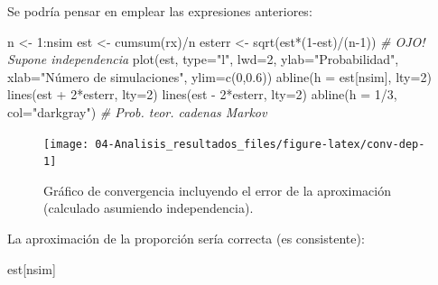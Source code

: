 \documentclass[
]{book}
\newenvironment{Shaded}{\begin{snugshade}}{\end{snugshade}}
\newcommand{\AttributeTok}[1]{\textcolor[rgb]{0.77,0.63,0.00}{#1}}
\newcommand{\CommentTok}[1]{\textcolor[rgb]{0.56,0.35,0.01}{\textit{#1}}}
\newcommand{\DecValTok}[1]{\textcolor[rgb]{0.00,0.00,0.81}{#1}}
\newcommand{\FloatTok}[1]{\textcolor[rgb]{0.00,0.00,0.81}{#1}}
\newcommand{\FunctionTok}[1]{\textcolor[rgb]{0.00,0.00,0.00}{#1}}
\newcommand{\NormalTok}[1]{#1}
\newcommand{\OtherTok}[1]{\textcolor[rgb]{0.56,0.35,0.01}{#1}}
\newcommand{\SpecialCharTok}[1]{\textcolor[rgb]{0.00,0.00,0.00}{#1}}
\newcommand{\StringTok}[1]{\textcolor[rgb]{0.31,0.60,0.02}{#1}}
\theoremstyle{break}
\theoremstyle{definition}
\theoremstyle{definition}
\theoremstyle{definition}
\theoremstyle{definition}
\theoremstyle{remark}
\begin{document}
Se podría pensar en emplear las expresiones anteriores:

\begin{Shaded}
\begin{Highlighting}[]
\NormalTok{n }\OtherTok{\textless{}{-}} \DecValTok{1}\SpecialCharTok{:}\NormalTok{nsim}
\NormalTok{est }\OtherTok{\textless{}{-}} \FunctionTok{cumsum}\NormalTok{(rx)}\SpecialCharTok{/}\NormalTok{n}
\NormalTok{esterr }\OtherTok{\textless{}{-}} \FunctionTok{sqrt}\NormalTok{(est}\SpecialCharTok{*}\NormalTok{(}\DecValTok{1}\SpecialCharTok{{-}}\NormalTok{est)}\SpecialCharTok{/}\NormalTok{(n}\DecValTok{{-}1}\NormalTok{)) }\CommentTok{\# OJO! Supone independencia}
\FunctionTok{plot}\NormalTok{(est, }\AttributeTok{type=}\StringTok{"l"}\NormalTok{, }\AttributeTok{lwd=}\DecValTok{2}\NormalTok{, }\AttributeTok{ylab=}\StringTok{"Probabilidad"}\NormalTok{, }
     \AttributeTok{xlab=}\StringTok{"Número de simulaciones"}\NormalTok{, }\AttributeTok{ylim=}\FunctionTok{c}\NormalTok{(}\DecValTok{0}\NormalTok{,}\FloatTok{0.6}\NormalTok{))}
\FunctionTok{abline}\NormalTok{(}\AttributeTok{h =}\NormalTok{ est[nsim], }\AttributeTok{lty=}\DecValTok{2}\NormalTok{)}
\FunctionTok{lines}\NormalTok{(est }\SpecialCharTok{+} \DecValTok{2}\SpecialCharTok{*}\NormalTok{esterr, }\AttributeTok{lty=}\DecValTok{2}\NormalTok{) }
\FunctionTok{lines}\NormalTok{(est }\SpecialCharTok{{-}} \DecValTok{2}\SpecialCharTok{*}\NormalTok{esterr, }\AttributeTok{lty=}\DecValTok{2}\NormalTok{)}
\FunctionTok{abline}\NormalTok{(}\AttributeTok{h =} \DecValTok{1}\SpecialCharTok{/}\DecValTok{3}\NormalTok{, }\AttributeTok{col=}\StringTok{"darkgray"}\NormalTok{)     }\CommentTok{\# Prob. teor. cadenas Markov}
\end{Highlighting}
\end{Shaded}

\begin{figure}[!htb]

{\centering \texttt{[image: 04-Analisis\_resultados\_files/figure-latex/conv-dep-1]} 

}

\caption{Gráfico de convergencia incluyendo el error de la aproximación (calculado asumiendo independencia).}\label{fig:conv-dep}
\end{figure}

La aproximación de la proporción sería correcta (es consistente):

\begin{Shaded}
\begin{Highlighting}[]
\NormalTok{est[nsim]}
\end{Highlighting}
\end{Shaded}
\end{document}
